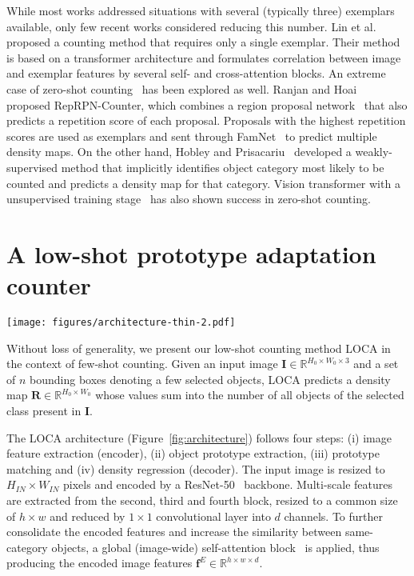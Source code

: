 \documentclass[10pt,twocolumn,letterpaper]{article}
\begin{document}
While most works addressed situations with several (typically three) exemplars available, only few recent works considered reducing this number.
Lin et al.~\cite{laonet} proposed a counting method that requires only a single exemplar. 
Their method is based on a transformer architecture and formulates correlation between image and exemplar features by several self- and cross-attention blocks. 
An extreme case of zero-shot counting~\cite{repprncount, hobley} has been explored as well.
Ranjan and Hoai~\cite{repprncount} proposed RepRPN-Counter, which combines a region proposal network~\cite{fasterrcnn} that also predicts a repetition score of each proposal. 
Proposals with the highest repetition scores are used as exemplars and sent through FamNet~\cite{famnet} to predict multiple density maps.
On the other hand, Hobley and Prisacariu~\cite{hobley} developed a weakly-supervised method that implicitly identifies object category most likely to be counted and predicts a density map for that category. Vision transformer with a unsupervised training stage~\cite{countr} has also shown success in zero-shot counting.


\section{A low-shot prototype adaptation counter}\label{sec:method}

\begin{figure*}[t]
    \centering
    \texttt{[image: figures/architecture-thin-2.pdf]}
    \caption{The LOCA architecture.
    Input image is encoded into features $\mathbf{f}^{E}$, which are depth-wise correlated (*) by $n$ object queries predicted by the object prototype extraction module. 
    The response map $\tilde{\mathbf{R}}$ is obtained by computing per-element maximum of $n$ similarity maps $\tilde{\mathbf{R}}_i$ and then upsampled by decoder to the final density map.}
    \label{fig:architecture}
\end{figure*}

Without loss of generality, we present our low-shot counting method LOCA in the context of few-shot counting.
Given an input image $\mathbf{I} \in \mathbb{R}^{H_0 \times W_0 \times 3}$ and a set of $n$ bounding boxes denoting a few selected objects, LOCA predicts a density map $\boldsymbol{R} \in \mathbb{R}^{H_0 \times W_0}$ whose values sum into the number of all objects of the selected class present in $\mathbf{I}$.

The LOCA architecture (Figure~\ref{fig:architecture}) follows four steps: 
(i) image feature extraction (encoder), 
(ii) object prototype extraction, 
(iii) prototype matching and (iv) density regression (decoder).
The input image is resized to $H_{IN}\times W_{IN}$ pixels and encoded by a ResNet-50~\cite{resnet} backbone. 
Multi-scale features are extracted from the second, third and fourth block, resized to a common size of $h\times w$ and reduced by $1 \times 1$ convolutional layer into $d$ channels.
To further consolidate the encoded features and increase the similarity between same-category objects, a global (image-wide) self-attention block~\cite{transformer,detr} is applied, thus producing the encoded image features
$\mathbf{f}^{E} \in \mathbb{R}^{h\times w\times d}$.
\end{document}

